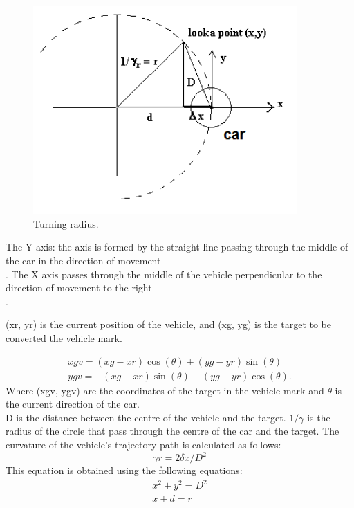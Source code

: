 \documentclass{llncs}
\begin{document}
\begin{figure}[h!]
	
	\centering
	\includegraphics[width=0.9\textwidth]{fig/salm2.png}
	
	
	\begin{minipage}{10cm}
		\centering
		\caption{\footnotesize Turning radius.}
		\label{fig05}
	\end{minipage} 
	
\end{figure}

The Y axis: the axis is formed by the straight line passing through the middle of the car in the direction of movement \\.	
The X axis passes through the middle of the vehicle perpendicular to the direction of movement to the right \\.

(xr, yr) is the current position of the vehicle, and (xg, yg) is the target to be  converted the vehicle mark.

\begin{gather}
xgv = (xg - xr)\cos(\theta)+ (yg-yr)\sin(\theta)\\
ygv = -(xg - xr)\sin(\theta) + (yg-yr)\cos(\theta).
\end{gather}
Where (xgv, ygv) are the coordinates of the target in the vehicle mark and $\theta $ is the current direction of the car.\\
D is the distance between the centre of the vehicle and the target.  $1 /\gamma$ is the radius of the circle that pass through the centre of the car and the target.
The curvature of the vehicle's trajectory path is calculated as follows:
\begin{equation}	
\gamma r = 2\delta x/D^2		
\end{equation}
This equation is obtained using the following equations:
\begin{gather}
x^2 + y^2 = D^2	\\
x + d = r  
\end{gather}
\end{document}
